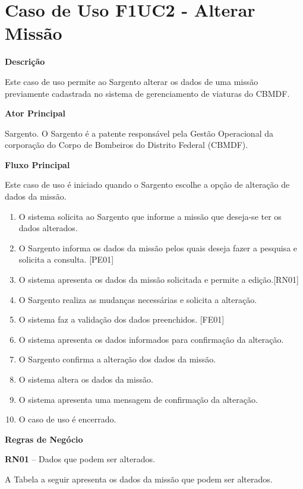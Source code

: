   \section{Caso de Uso F1UC2 - Alterar Missão}

  {\raggedright
      \textbf{Descrição}
  }
  
    Este caso de uso permite ao Sargento alterar os dados de uma missão previamente cadastrada no sistema de gerenciamento de viaturas do CBMDF.

  {\raggedright
      \textbf{Ator Principal}
  }

    Sargento. O Sargento é a patente responsável pela Gestão Operacional da corporação do Corpo de Bombeiros do Distrito Federal (CBMDF).
  
  {\raggedright
      \textbf{Fluxo Principal}
  }
  
    Este caso de uso é iniciado quando o Sargento escolhe a opção de alteração de dados da missão.
    
  \begin{enumerate}
  \item O sistema solicita ao Sargento que informe a missão que deseja-se ter os dados alterados.
  \item O Sargento informa os dados da missão pelos quais deseja fazer a pesquisa e solicita a consulta. [PE01]
  \item O sistema apresenta os dados da missão solicitada e permite a edição.[RN01]
  \item O Sargento realiza as mudanças necessárias e solicita a alteração.
  \item O sistema faz a validação dos dados preenchidos.  [FE01]
  \item O sistema apresenta os dados informados para confirmação da alteração.
  \item O Sargento confirma a alteração dos dados da missão.
  \item O sistema altera os dados da missão.
  \item O sistema apresenta uma mensagem de confirmação da alteração.
  \item O caso de uso é encerrado.
  \end{enumerate}
  
  \pagebreak
  
   {\raggedright
      \textbf{Regras de Negócio}
   }
   
   \textbf{RN01} – Dados que podem ser alterados.
   
   A Tabela a seguir apresenta os dados da missão que podem ser alterados.
   
